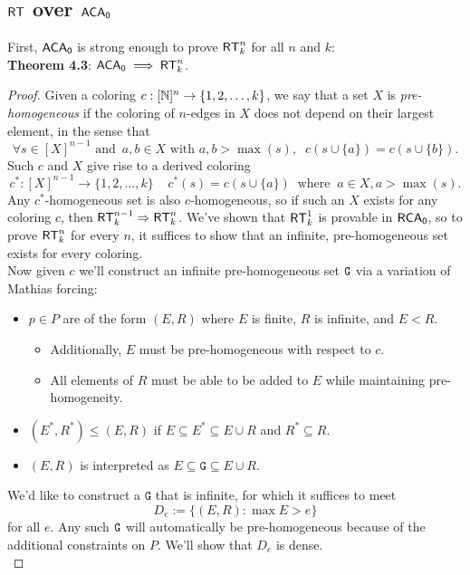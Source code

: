 \documentclass{amsart}
\begin{document}
	
	\subsection{\texorpdfstring{$\operatorname{\sf{RT}}$ over $\operatorname{\sf{ACA_0}}$}{RT over ACA}}
	
	First, $\operatorname{\sf{ACA_0}}$ is strong enough to prove $\operatorname{\sf{RT}}^n_k$ for all $n$ and $k$:\\
	
	\noindent \textbf{Theorem 4.3}: $\operatorname{\sf{ACA_0}}\implies \operatorname{\sf{RT}}^n_k$. 
	\begin{proof}
		Given a coloring $c:[\mathbb{N}]^n\to \{1,2,\dots,k\}$, we say that a set $X$ is \textit{pre-homogeneous} if the coloring of $n$-edges in $X$ does not depend on their largest element, in the sense that 
		$$
		\forall s\in [X]^{n-1} \text{ and } \, a,b \in X \text{ with } a,b>\max(s), \;\; c(s\cup \{a\}) = c(s\cup \{b\}).
		$$
		Such $c$ and $X$ give rise to a derived coloring 
		$$
		c^*:[X]^{n-1}\to \{1,2,\dots,k\} \;\;\;\; c^*(s) = c(s\cup \{a\}) \;\; \text{where} \;\; a\in X, a>\max(s).
		$$
		Any $c^*$-homogeneous set is also $c$-homogeneous, so if such an $X$ exists for any coloring $c$, then $\operatorname{\sf{RT}}^{n-1}_k\Rightarrow \operatorname{\sf{RT}}^n_k$. We've shown that $\operatorname{\sf{RT}}^1_k$ is provable in $\operatorname{\sf{RCA_0}}$, so to prove $\operatorname{\sf{RT}}^n_k$ for every $n$, it suffices to show that an infinite, pre-homogeneous set exists for every coloring.\\
		
		Now given $c$ we'll construct an infinite pre-homogeneous set $\tt{G}$ via a variation of Mathias forcing:
		\begin{itemize}
			\item $p\in P$ are of the form $(E,R)$ where $E$ is finite, $R$ is infinite, and $E<R$.
			\begin{itemize}
				\item Additionally, $E$ must be pre-homogeneous with respect to $c$.
				\item All elements of $R$ must be able to be added to $E$ while maintaining pre-homogeneity.
			\end{itemize}
			\item $(E^*,R^*)\leq (E,R)$ if $E\subseteq E^*\subseteq E\cup R$ and $R^*\subseteq R$.
			\item $(E,R)$ is interpreted as $E\subseteq \mathtt{G}\subseteq E\cup R$.
		\end{itemize}
		We'd like to construct a $\mathtt{G}$ that is infinite, for which it suffices to meet
		$$
		D_e := \{(E,R) : \max{E}>e\}
		$$
		for all $e$. Any such $\tt{G}$ will automatically be pre-homogeneous because of the additional constraints on $P$. We'll show that $D_e$ is dense.\\
		

\end{proof}
\end{document}
